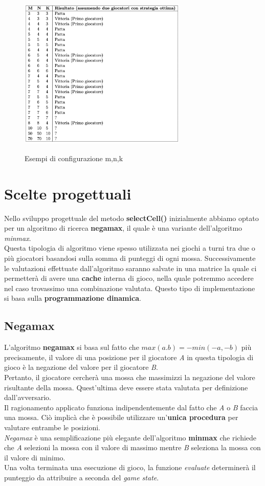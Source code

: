 \documentclass{article}
\begin{document}
\begin{figure}[h!]
\centering
\includegraphics[width=8cm,height=8cm]{img/match.png}
\caption{Esempi di configurazione m,n,k}
\label{fig:universe}
\end{figure}

\section{Scelte progettuali}
    Nello sviluppo progettuale del metodo \textbf{selectCell()} inizialmente abbiamo optato per un algoritmo di ricerca \textbf{negamax}, il quale è una variante dell'algoritmo  \textit{minmax}.\\
    Questa tipologia di algoritmo viene spesso utilizzata nei giochi a turni tra due o più giocatori basandosi sulla somma di punteggi di ogni mossa. Successivamente le valutazioni effettuate dall'algoritmo saranno salvate in una matrice la quale ci permetterà di avere una \textbf{cache} interna di gioco, nella quale potremmo accedere nel caso trovassimo una combinazione valutata. Questo tipo di implementazione si basa sulla \textbf{programmazione dinamica}.
    
    \subsection{Negamax}
    L'algoritmo \textbf{negamax} \cite{Negamax} si basa sul fatto che $max(a.b) = -min(-a,-b)$ più precisamente, il valore di una posizione per il giocatore \textit{A} in questa tipologia di gioco è la negazione del valore per il giocatore \textit{B}.\\
    Pertanto, il giocatore cercherà una mossa che massimizzi la negazione del valore risultante della mossa. Quest'ultima deve essere stata valutata per definizione dall'avversario.\\
   Il ragionamento applicato funziona indipendentemente dal fatto che \textit{A} o \textit{B} faccia una mossa. Ciò implicà che è possibile utilizzare un'\textbf{unica procedura} per valutare entrambe le posizioni.\\
   \textit{Negamax} è una semplificazione più elegante dell'algoritmo \textbf{minmax} che richiede che \textit{A} selezioni la mossa con il valore di massimo mentre \textit{B} seleziona la mossa con il valore di minimo.\\
    Una volta terminata una esecuzione di gioco, la funzione \textit{evaluate} determinerà il punteggio da attribuire a seconda del \textit{game state}.
   
\end{document}
